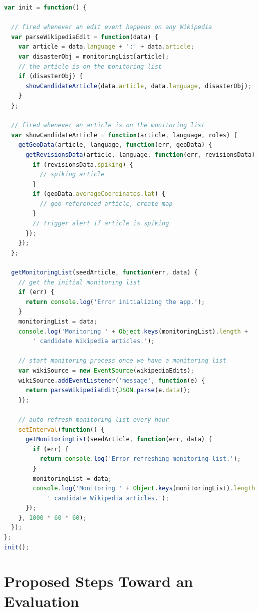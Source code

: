 \documentclass[letterpaper]{article}
\begin{document}
\begin{lstlisting}[caption={Monitoring loop of the natural disaster monitor},
  label=listing:monitoring, language=JavaScript,
  float=b!, stringstyle=\color{gray},morekeywords={for,if,console,log,addEventListener,JSON,parse,stringify,forEach}]
var init = function() {

  // fired whenever an edit event happens on any Wikipedia
  var parseWikipediaEdit = function(data) {
    var article = data.language + ':' + data.article;
    var disasterObj = monitoringList[article];
    // the article is on the monitoring list
    if (disasterObj) {    
      showCandidateArticle(data.article, data.language, disasterObj);
    }
  };
  
  // fired whenever an article is on the monitoring list
  var showCandidateArticle = function(article, language, roles) {
    getGeoData(article, language, function(err, geoData) {
      getRevisionsData(article, language, function(err, revisionsData) {
        if (revisionsData.spiking) {
          // spiking article
        }
        if (geoData.averageCoordinates.lat) {
          // geo-referenced article, create map
        }
        // trigger alert if article is spiking
      });
    });
  };  

  getMonitoringList(seedArticle, function(err, data) {
    // get the initial monitoring list
    if (err) {
      return console.log('Error initializing the app.');
    }
    monitoringList = data;
    console.log('Monitoring ' + Object.keys(monitoringList).length +
        ' candidate Wikipedia articles.');
    
    // start monitoring process once we have a monitoring list
    var wikiSource = new EventSource(wikipediaEdits);
    wikiSource.addEventListener('message', function(e) {
      return parseWikipediaEdit(JSON.parse(e.data));
    });
    
    // auto-refresh monitoring list every hour
    setInterval(function() {
      getMonitoringList(seedArticle, function(err, data) {
        if (err) {
          return console.log('Error refreshing monitoring list.');
        }
        monitoringList = data;
        console.log('Monitoring ' + Object.keys(monitoringList).length +
            ' candidate Wikipedia articles.');
      });
    }, 1000 * 60 * 60);
  });
};
init();
\end{lstlisting}

\section{Proposed Steps Toward an Evaluation}
\end{document}

